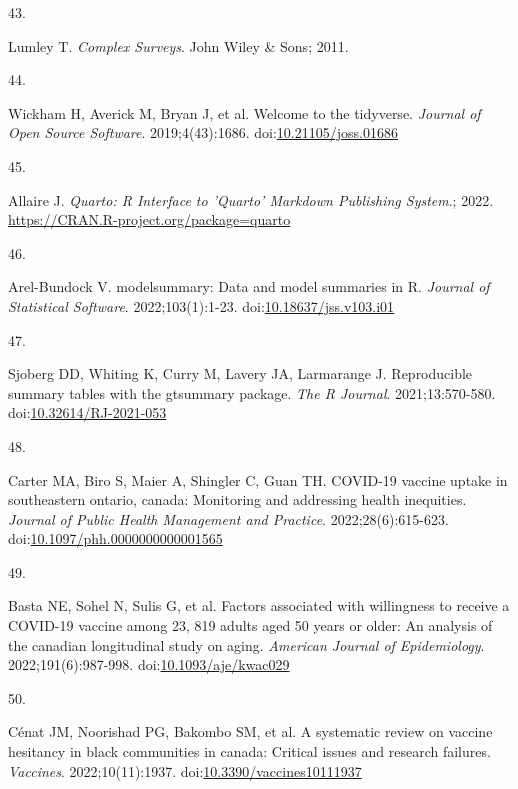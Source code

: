 \documentclass[
]{article}
\newlength{\cslhangindent}
\newlength{\csllabelwidth}
\newlength{\cslentryspacingunit} %
\newenvironment{CSLReferences}[2] %
 {%
  \setlength{\parindent}{0pt}
  \ifodd #1
  \let\oldpar\par
  \def\par{\hangindent=\cslhangindent\oldpar}
  \fi
  \setlength{\parskip}{#2\cslentryspacingunit}
 }%
 {}
\newcommand{\CSLLeftMargin}[1]{\parbox[t]{\csllabelwidth}{#1}}
\newcommand{\CSLRightInline}[1]{\parbox[t]{\linewidth - \csllabelwidth}{#1}\break}
\begin{document}
\begin{CSLReferences}{0}{0}
\leavevmode{}%
\CSLLeftMargin{43. }%
\CSLRightInline{Lumley T. \emph{Complex Surveys}. John Wiley \& Sons;
2011.}

\leavevmode{}%
\CSLLeftMargin{44. }%
\CSLRightInline{Wickham H, Averick M, Bryan J, et al. Welcome to the
{tidyverse}. \emph{Journal of Open Source Software}. 2019;4(43):1686.
doi:\href{https://doi.org/10.21105/joss.01686}{10.21105/joss.01686}}

\leavevmode{}%
\CSLLeftMargin{45. }%
\CSLRightInline{Allaire J. \emph{Quarto: R Interface to 'Quarto'
Markdown Publishing System}.; 2022.
\url{https://CRAN.R-project.org/package=quarto}}

\leavevmode{}%
\CSLLeftMargin{46. }%
\CSLRightInline{Arel-Bundock V. {modelsummary}: Data and model summaries
in {R}. \emph{Journal of Statistical Software}. 2022;103(1):1-23.
doi:\href{https://doi.org/10.18637/jss.v103.i01}{10.18637/jss.v103.i01}}

\leavevmode{}%
\CSLLeftMargin{47. }%
\CSLRightInline{Sjoberg DD, Whiting K, Curry M, Lavery JA, Larmarange J.
Reproducible summary tables with the gtsummary package. \emph{{The R
Journal}}. 2021;13:570-580.
doi:\href{https://doi.org/10.32614/RJ-2021-053}{10.32614/RJ-2021-053}}

\leavevmode{}%
\CSLLeftMargin{48. }%
\CSLRightInline{Carter MA, Biro S, Maier A, Shingler C, Guan TH.
{COVID}-19 vaccine uptake in southeastern ontario, canada: Monitoring
and addressing health inequities. \emph{Journal of Public Health
Management and Practice}. 2022;28(6):615-623.
doi:\href{https://doi.org/10.1097/phh.0000000000001565}{10.1097/phh.0000000000001565}}

\leavevmode{}%
\CSLLeftMargin{49. }%
\CSLRightInline{Basta NE, Sohel N, Sulis G, et al. Factors associated
with willingness to receive a {COVID}-19 vaccine among 23, 819 adults
aged 50 years or older: An analysis of the canadian longitudinal study
on aging. \emph{American Journal of Epidemiology}. 2022;191(6):987-998.
doi:\href{https://doi.org/10.1093/aje/kwac029}{10.1093/aje/kwac029}}

\leavevmode{}%
\CSLLeftMargin{50. }%
\CSLRightInline{Cénat JM, Noorishad PG, Bakombo SM, et al. A systematic
review on vaccine hesitancy in black communities in canada: Critical
issues and research failures. \emph{Vaccines}. 2022;10(11):1937.
doi:\href{https://doi.org/10.3390/vaccines10111937}{10.3390/vaccines10111937}}


\end{CSLReferences}
\end{document}
